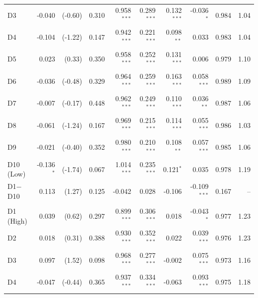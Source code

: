 \begin{table}[!htbp]
{\begin{tabular*}{\linewidth}{@{\extracolsep{\fill}}lrrrrrrrrr}
\hspace{1em}D3 & -0.040 & (-0.60) & 0.310 & 0.958$^{***}$ & 0.289$^{***}$ & 0.132$^{***}$ & -0.036$^{*}$ & 0.984 & 1.04\\
\hspace{1em}D4 & -0.104 & (-1.22) & 0.147 & 0.942$^{***}$ & 0.221$^{***}$ & 0.098$^{**}$ & 0.033 & 0.983 & 1.04\\
\hspace{1em}D5 & 0.023 & (0.33) & 0.350 & 0.958$^{***}$ & 0.252$^{***}$ & 0.131$^{***}$ & 0.006 & 0.979 & 1.10\\
\hspace{1em}D6 & -0.036 & (-0.48) & 0.329 & 0.964$^{***}$ & 0.259$^{***}$ & 0.163$^{***}$ & 0.058$^{***}$ & 0.989 & 1.09\\
\hspace{1em}D7 & -0.007 & (-0.17) & 0.448 & 0.962$^{***}$ & 0.249$^{***}$ & 0.110$^{***}$ & 0.036$^{**}$ & 0.987 & 1.06\\
\hspace{1em}D8 & -0.061 & (-1.24) & 0.167 & 0.969$^{***}$ & 0.215$^{***}$ & 0.114$^{***}$ & 0.055$^{***}$ & 0.986 & 1.03\\
\hspace{1em}D9 & -0.021 & (-0.40) & 0.352 & 0.980$^{***}$ & 0.210$^{***}$ & 0.108$^{**}$ & 0.057$^{***}$ & 0.985 & 1.06\\
\hspace{1em}D10 (Low) & -0.136$^{*}$ & (-1.74) & 0.067 & 1.014$^{***}$ & 0.235$^{***}$ & 0.121$^{*}$ & 0.035 & 0.978 & 1.19\\
\hspace{1em}D1$-$D10 & 0.113 & (1.27) & 0.125 & -0.042 & 0.028 & -0.106 & -0.109$^{***}$ & 0.167 & --\\
\addlinespace[0.3em]
\hline
\multicolumn{10}{l}{\textit{Panel T3: Highest activeness tercile (highest formation $1-R^2$)}}\\
\hspace{1em}D1 (High) & 0.039 & (0.62) & 0.297 & 0.899$^{***}$ & 0.306$^{***}$ & 0.018 & -0.043$^{*}$ & 0.977 & 1.23\\
\hspace{1em}D2 & 0.018 & (0.31) & 0.388 & 0.930$^{***}$ & 0.352$^{***}$ & 0.022 & 0.039$^{***}$ & 0.976 & 1.23\\
\hspace{1em}D3 & 0.097 & (1.52) & 0.098 & 0.968$^{***}$ & 0.277$^{***}$ & -0.002 & 0.075$^{***}$ & 0.973 & 1.16\\
\hspace{1em}D4 & -0.047 & (-0.44) & 0.365 & 0.937$^{***}$ & 0.334$^{***}$ & -0.063 & 0.093$^{***}$ & 0.975 & 1.18\\

\end{tabular*}}
\end{table}

